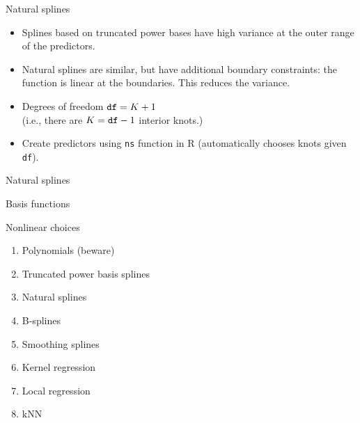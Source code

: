 \documentclass[14pt]{beamer}
\begin{document}
\begin{frame}[fragile]{Natural splines}

\begin{itemize}
\item 
Splines based on truncated power bases have high variance at the outer range of the predictors.
\item Natural splines are similar, but have additional \alert{boundary constraints}: the function is linear at the boundaries. This reduces the variance.

\item Degrees of freedom $\verb|df|=K+1$\\ (i.e., there are $K=\verb|df|-1$ interior knots.)

\item Create predictors using \verb|ns| function in R (automatically chooses knots given \verb|df|).


\end{itemize}

\end{frame}

\begin{frame}{Natural splines}

\end{frame}

\begin{frame}{Basis functions}
\end{frame}

\begin{frame}{Nonlinear choices}
\begin{enumerate}
\item Polynomials (beware)
\item Truncated power basis splines
\item Natural splines
\item B-splines
\item Smoothing splines
\item Kernel regression
\item Local regression
\item kNN
\end{enumerate}
\end{frame}
\end{document}
